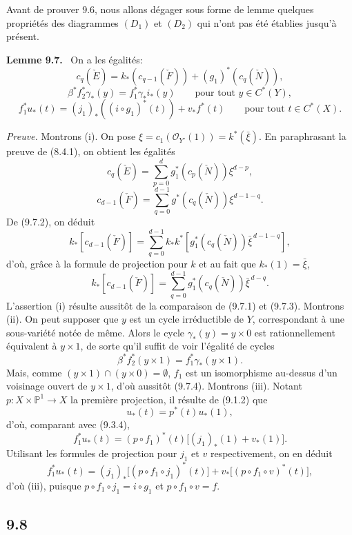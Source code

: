 \documentclass[11pt]{article}
\newenvironment{statement}[1]{\par\medskip\noindent\textbf{#1.}\ }{\par\medskip}
\begin{document}
Avant de prouver 9.6, nous allons dégager sous forme de lemme quelques propriétés des diagrammes $(D_1)$ et $(D_2)$ qui n'ont pas été établies jusqu'à présent.

\begin{statement}{Lemme 9.7}
On a les égalités:
\[
c_q(\check E)=k_*(c_{q-1}(\check F))+(g_1)^*(c_q(\check N)),
\tag{9.7 i}
\]
\[
\beta^*f_2^*\gamma_*(y)=f_1^*\gamma_*i_*(y)\qquad\text{pour tout }y\in C^*(Y),
\tag{9.7 ii}
\]
\[
f_1^*u_*(t)=(j_1)_*((i\circ g_1)^*(t))+v_*f^*(t)\qquad\text{pour tout }t\in C^*(X).
\tag{9.7 iii}
\]
\end{statement}

\emph{Preuve.} Montrons (i). On pose $\xi=c_1(\mathcal O_{Y'}(1))=k^*(\bar\xi)$. En paraphrasant la preuve de (8.4.1), on obtient les égalités
\[
c_q(\check E)=\sum_{p=0}^d g_1^*(c_p(\check N))\xi^{d-p},
\tag{9.7.1}
\]
\[
c_{d-1}(\check F)=\sum_{q=0}^{d-1}g^*(c_q(\check N))\xi^{d-1-q}.
\tag{9.7.2}
\]
De (9.7.2), on déduit
\[
k_*[c_{d-1}(\check F)]
=\sum_{q=0}^{d-1}k_*k^*[g_1^*(c_q(\check N))\bar\xi^{\,d-1-q}],
\]
d'où, grâce à la formule de projection pour $k$ et au fait que $k_*(1)=\bar\xi$,
\[
k_*[c_{d-1}(\check F)]=\sum_{q=0}^{d-1}g_1^*(c_q(\check N))\bar\xi^{\,d-q}.
\tag{9.7.3}
\]
L'assertion (i) résulte aussitôt de la comparaison de (9.7.1) et (9.7.3). Montrons (ii). On peut supposer que $y$ est un cycle irréductible de $Y$, correspondant à une sous-variété notée de même. Alors le cycle $\gamma_*(y)=y\times0$ est rationnellement équivalent à $y\times1$, de sorte qu'il suffit de voir l'égalité de cycles
\[
\beta^*f_2^*(y\times1)=f_1^*\gamma_*(y\times1).
\tag{9.7.4}
\]
Mais, comme $(y\times1)\cap(y\times0)=\emptyset$, $f_1$ est un isomorphisme au-dessus d'un voisinage ouvert de $y\times1$, d'où aussitôt (9.7.4). Montrons (iii). Notant $p:X\times\mathbb P^1\to X$ la première projection, il résulte de (9.1.2) que
\[
u_*(t)=p^*(t)u_*(1),
\tag{9.7.5}
\]
d'où, comparant avec (9.3.4),
\[
f_1^*u_*(t)=(p\circ f_1)^*(t)\bigl[(j_1)_*(1)+v_*(1)\bigr].
\tag{9.7.6}
\]
Utilisant les formules de projection pour $j_1$ et $v$ respectivement, on en déduit
\[
f_1^*u_*(t)=(j_1)_*\bigl[(p\circ f_1\circ j_1)^*(t)\bigr]+v_*\bigl[(p\circ f_1\circ v)^*(t)\bigr],
\tag{9.7.7}
\]
d'où (iii), puisque $p\circ f_1\circ j_1=i\circ g_1$ et $p\circ f_1\circ v=f$.

\subsection*{9.8}
\end{document}
